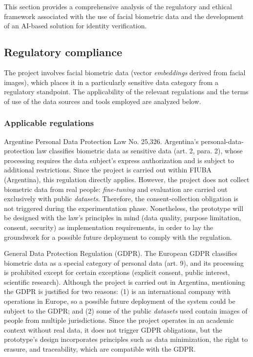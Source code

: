 \documentclass[
  11pt, %
]{charter}
\begin{document}
This section provides a comprehensive analysis of the regulatory and ethical framework associated with the use of facial biometric data and the development of an AI-based solution for identity verification.

\subsection{Regulatory compliance}

The project involves facial biometric data (vector \textit{embeddings} derived from facial images), which places it in a particularly sensitive data category from a regulatory standpoint. The applicability of the relevant regulations and the terms of use of the data sources and tools employed are analyzed below.

\subsubsection{Applicable regulations}

Argentine Personal Data Protection Law No. 25,326. Argentina's personal-data-protection law classifies biometric data as sensitive data (art. 2, para. 2), whose processing requires the data subject's express authorization and is subject to additional restrictions. Since the project is carried out within FIUBA (Argentina), this regulation directly applies. However, the project does not collect biometric data from real people: \textit{fine-tuning} and evaluation are carried out exclusively with public \textit{datasets}. Therefore, the consent-collection obligation is not triggered during the experimentation phase. Nonetheless, the prototype will be designed with the law's principles in mind (data quality, purpose limitation, consent, security) as implementation requirements, in order to lay the groundwork for a possible future deployment to comply with the regulation.

General Data Protection Regulation (GDPR). The European GDPR classifies biometric data as a special category of personal data (art. 9), and its processing is prohibited except for certain exceptions (explicit consent, public interest, scientific research). Although the project is carried out in Argentina, mentioning the GDPR is justified for two reasons: (1) \empclientename\hspace{1px} is an international company with operations in Europe, so a possible future deployment of the system could be subject to the GDPR; and (2) some of the public \textit{datasets} used contain images of people from multiple jurisdictions. Since the project operates in an academic context without real data, it does not trigger GDPR obligations, but the prototype's design incorporates principles such as data minimization, the right to erasure, and traceability, which are compatible with the GDPR.
\end{document}
